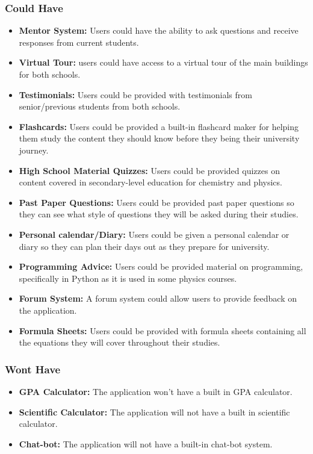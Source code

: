\documentclass{l4proj}
\begin{document}
\subsubsection{Could Have}
\begin{itemize}
    \item \textbf{Mentor System:} Users could have the ability to ask questions and receive responses from current students.
    \item \textbf{Virtual Tour:} users could have access to a virtual tour of the main buildings for both schools.
    \item \textbf{Testimonials:} Users could be provided with testimonials from senior/previous students from both schools.
    \item \textbf{Flashcards:} Users could be provided a built-in flashcard maker for helping them study the content they should know before they being their university journey.
    \item \textbf{High School Material Quizzes:} Users could be provided quizzes on content covered in secondary-level education for chemistry and physics.
    \item \textbf{Past Paper Questions:} Users could be provided past paper questions so they can see what style of questions they will be asked during their studies.
    \item \textbf{Personal calendar/Diary:} Users could be given a personal calendar or diary so they can plan their days out as they prepare for university.
    \item\textbf{Programming Advice:} Users could be provided material on programming,  specifically in Python as it is used in some physics courses.
    \item \textbf{Forum System:} A forum system could allow users to provide feedback on the application.
    \item \textbf{Formula Sheets:} Users could be provided with formula sheets containing all the equations they will cover throughout their studies.
\end{itemize}

\subsubsection{Wont Have}
\begin{itemize}
    \item \textbf{GPA Calculator:} The application won't have a built in GPA calculator.
    \item \textbf{Scientific Calculator:} The application will not have a built in scientific calculator.
    \item \textbf{Chat-bot:} The application will not have a built-in chat-bot system.
\end{itemize}
\end{document}
